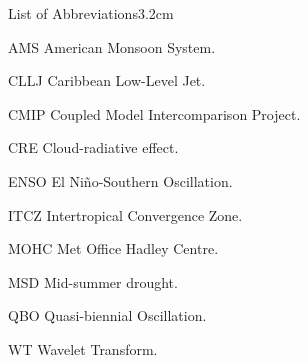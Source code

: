 \begin{mclistof}{List of Abbreviations}{3.2cm}

\item[AMS] American Monsoon System.

\item[CLLJ] Caribbean Low-Level Jet.

\item[CMIP] Coupled Model Intercomparison Project.

\item[CRE] Cloud-radiative effect.

\item[ENSO] El Niño-Southern Oscillation.

\item[ITCZ] Intertropical Convergence Zone.

\item[MOHC] Met Office Hadley Centre.

\item[MSD] Mid-summer drought.

\item[QBO] Quasi-biennial Oscillation.

\item[WT] Wavelet Transform.
\end{mclistof} 
